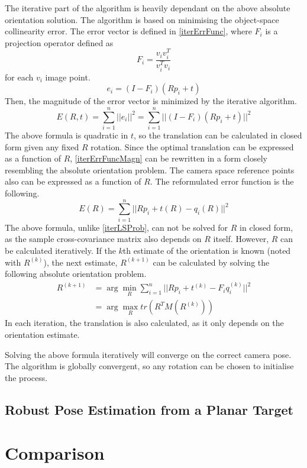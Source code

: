 The iterative part of the algorithm is heavily dependant on the above absolute orientation solution.
The algorithm is based on minimising the object-space collinearity error.
The error vector is defined in \eqref{iterErrFunc}, where $F_i$ is a projection operator defined as
\begin{equation}
	F_i = \frac{v_iv_i^T}{v_i^Tv_i}
\end{equation}
for each $v_i$ image point.
\begin{equation}
	e_i = (I - F_i)(Rp_i + t)
	\label{eq:iterErrFunc}
\end{equation}
Then, the magnitude of the error vector is minimized by the iterative algorithm.
\begin{equation}
	E(R,t) = \sum_{i=1}^{n} ||e_i||^2 = \sum_{i=1}^{n} ||(I - F_i)(Rp_i + t)||^2 
	\label{eq:iterErrFuncMagn}
\end{equation}
The above formula is quadratic in $t$, so the translation can be calculated in closed form given any fixed $R$ rotation.
Since the optimal translation can be expressed as a function of $R$, \eqref{iterErrFuncMagn} can be rewritten in a form closely resembling the absolute orientation problem.
The camera space reference points also can be expressed as a function of $R$.
The reformulated error function is the following.
\begin{equation}
	E(R) = \sum_{i=1}^{n} || Rp_i + t(R) - q_i(R) ||^2
\end{equation}
The above formula, unlike \eqref{iterLSProb}, can not be solved for $R$ in closed form, as the sample cross-covariance matrix also depends on $R$ itself.
However, $R$ can be calculated iteratively.
If the $k$th estimate of the orientation is known (noted with $R^{(k)}$), the next estimate, $R^{(k+1)}$ can be calculated by solving the following absolute orientation problem.
\begin{align}
	R^{(k+1)} &= \arg \min_R \sum_{i=1}^{n} || Rp_i + t^{(k)} - F_iq_i^{(k)} ||^2 \\
			  &= \arg \max_R tr(R^TM(R^{(k)})) 
\end{align}
In each iteration, the translation is also calculated, as it only depends on the orientation estimate.

Solving the above formula iteratively will converge on the correct camera pose\cite{iterative}.
The algorithm is globally convergent, so any rotation can be chosen to initialise the process.

\subsection{Robust Pose Estimation from a Planar Target}

\section{Comparison}

